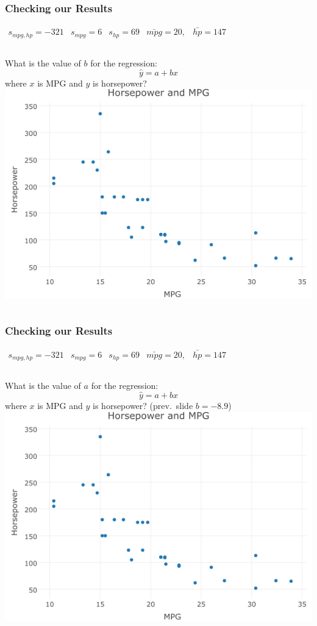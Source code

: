 \documentclass{beamer}
\begin{document}
\begin{frame}
\frametitle{Checking our Results}
	$\begin{array}{ccccc} 
		s_{mpg, hp} = -321 & s_{mpg} = 6 & s_{hp} = 69 & \bar{mpg} = 20,& \bar{hp} = 147
	\end{array}$
	\begin{columns}[c]
		\column{2.5in}
			What is the value of $b$ for the regression: 
			$$
			\hat{y} = a + bx
			$$
			where $x$ is MPG and $y$ is horsepower?
		\column{1.8in}
			\includegraphics[scale = 0.25]{./images/cars.png}
	\end{columns}
\end{frame}

\begin{frame}
\frametitle{Checking our Results}
	$\begin{array}{ccccc} 
		s_{mpg, hp} = -321 & s_{mpg} = 6 & s_{hp} = 69 & \bar{mpg} = 20,& \bar{hp} = 147
	\end{array}$
	\begin{columns}[c]
		\column{2.5in}
			What is the value of $a$ for the regression: $$\hat{y} = a + bx$$
			where $x$ is MPG and $y$ is horsepower? (prev.\ slide $b = -8.9$)
		\column{1.8in}
			\includegraphics[scale = 0.25]{./images/cars.png}
	\end{columns}
\end{frame}
\end{document}
